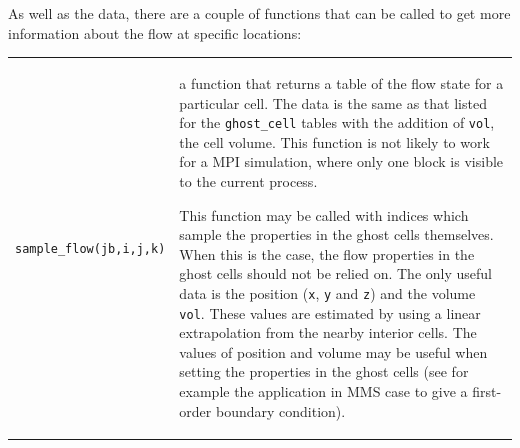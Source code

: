 \noindent
As well as the data, there are a couple of functions that can be called to get more information about
the flow at specific locations:\\
\begin{tabular}{ll} 
 \noalign{\smallskip} \hline \noalign{\smallskip}
 \texttt{sample\_flow(jb,i,j,k)} & \parbox{10cm}{a function that returns a table of 
                                      the flow state for a particular cell.  The data is the same as that
                                      listed for the \texttt{ghost\_cell} tables with the addition of \texttt{vol},
                                      the cell volume.  This function is not likely to work for a MPI simulation,
                                      where only one block is visible to the current process.

                                      This function may be called with indices which sample the properties
                                      in the ghost cells themselves. When this is the case, the flow properties
                                      in the ghost cells should not be relied on. The only useful data is
                                      the position (\texttt{x}, \texttt{y} and \texttt{z}) and the volume
                                      \texttt{vol}. These values are estimated by using a linear extrapolation
                                      from the nearby interior cells. The values of position and volume may
                                      be useful when setting the properties in the ghost cells (see for
                                      example the application in MMS case to give a first-order boundary
                                      condition).
                                                                             

}
\end{tabular}
